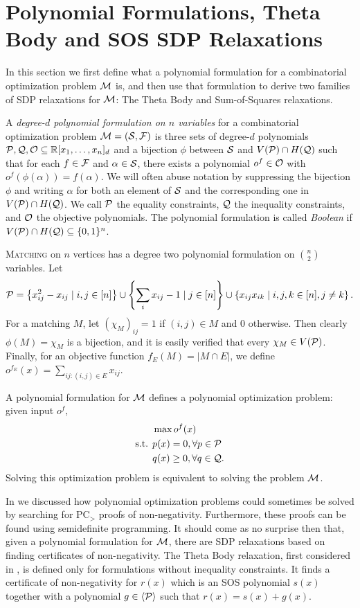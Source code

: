 \section{Polynomial Formulations, Theta Body and SOS SDP Relaxations}\label{sec:polyforms}
In this section we first define what a polynomial formulation for a combinatorial optimization problem $\mathcal M$ is, and then use that formulation to derive two families of SDP relaxations for $\mathcal M$: The Theta Body and Sum-of-Squares relaxations.
\begin{definition}
A \emph{degree-$d$ polynomial formulation on $n$ variables} for a combinatorial optimization problem $\mathcal M = (\mathcal S, \mathcal F)$ is three sets of degree-$d$ polynomials $\mathcal P,\mathcal Q,\mathcal O \subseteq \mathbb R[x_1,\dots,x_n]_d$ and a bijection $\phi$ between $\mathcal S$ and $V(\mathcal P) \cap H(\mathcal Q)$ such that for each $f \in \mathcal F$ and $\alpha \in \mathcal S$, there exists a polynomial $o^f \in \mathcal O$ with $o^f(\phi(\alpha)) = f(\alpha)$. We will often abuse notation by suppressing the bijection $\phi$ and writing $\alpha$ for both an element of $\mathcal S$ and the corresponding one in $V(\mathcal P) \cap H(\mathcal Q)$. We call $\mathcal P$ the equality constraints, $\mathcal Q$ the inequality constraints, and $\mathcal O$ the objective polynomials. The polynomial formulation is called \emph{Boolean} if $V(\mathcal P) \cap H(\mathcal Q) \subseteq \{0,1\}^n$.
\end{definition}
\begin{example}
\textsc{Matching} on $n$ vertices has a degree two polynomial formulation on $\binom{n}{2}$ variables. Let
\[\mathcal P = \left\{x_{ij}^2 - x_{ij} \mid i,j \in [n]\right\} \cup \left\{\sum_i x_{ij} - 1 \mid j \in [n]\right\} \cup \left\{x_{ij}x_{ik} \mid i,j,k \in [n], j\neq k\right\}.\]
For a matching $M$, let $(\chi_M)_{ij} = 1$ if $(i,j) \in M$ and $0$ otherwise. Then clearly $\phi(M) = \chi_M$ is a bijection, and it is easily verified that every $\chi_M \in V(\mathcal P)$. Finally, for an objective function $f_E(M) = |M \cap E|$, we define $o^{f_E}(x) = \sum_{ij: (i,j) \in E} x_{ij}$.
\end{example}
A polynomial formulation for $\mathcal M$ defines a polynomial optimization problem: given input $o^f$,
\begin{align*}
&\max o^f(x) \\
\text{s.t. } &p(x) = 0, \forall p \in \mathcal P \\
&q(x) \geq 0, \forall q \in \mathcal Q.
\end{align*}
Solving this optimization problem is equivalent to solving the problem $\mathcal M$.

In  we discussed how polynomial optimization problems could sometimes be solved by searching for PC$_>$ proofs of non-negativity. Furthermore, these proofs can be found using semidefinite programming. It should come as no surprise then that, given a polynomial formulation for $\mathcal M$, there are SDP relaxations based on finding certificates of non-negativity. The Theta Body relaxation, first considered in \cite{GPT10}, is defined only for formulations without inequality constraints. It finds a certificate of non-negativity for $r(x)$ which is an SOS polynomial $s(x)$ together with a polynomial $g \in \langle \mathcal P \rangle$ such that $r(x) = s(x) + g(x)$.

